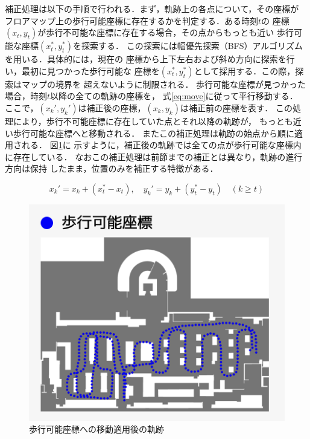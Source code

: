 補正処理は以下の手順で行われる．まず，軌跡上の各点について，その座標が
フロアマップ上の歩行可能座標に存在するかを判定する．ある時刻$t$の
座標$(x_t, y_t)$が歩行不可能な座標に存在する場合，その点からもっとも近い
歩行可能な座標$(x_t^*, y_t^*)$を探索する．
この探索には幅優先探索（BFS）アルゴリズムを用いる．具体的には，現在の
座標から上下左右および斜め方向に探索を行い，最初に見つかった歩行可能な
座標を$(x_t^*, y_t^*)$として採用する．この際，探索はマップの境界を
超えないように制限される．%
歩行可能な座標が見つかった場合，時刻$t$以降の全ての軌跡の座標を，
式\ref{eq:move}に従って平行移動する．
ここで，$(x_k', y_k')$は補正後の座標，$(x_k, y_k)$は補正前の座標を表す．
この処理により，歩行不可能座標に存在していた点とそれ以降の軌跡が，
もっとも近い歩行可能な座標へと移動される．
またこの補正処理は軌跡の始点から順に適用される．%
図\ref{fig:walkable-points}に
示すように，補正後の軌跡では全ての点が歩行可能な座標内に存在している．
なおこの補正処理は前節までの補正とは異なり，軌跡の進行方向は保持
したまま，位置のみを補正する特徴がある．

\begin{equation}
  \label{eq:move}
x_k' = x_k + (x_t^* - x_t), \quad y_k' = y_k + (y_t^* - y_t) \quad (k \geq t)
\end{equation}


\begin{figure}[H]
    \centering
    \includegraphics[width=\linewidth]{../image/walkable-points.jpg}
    \caption{歩行可能座標への移動適用後の軌跡}    \label{fig:walkable-points}
\end{figure}
